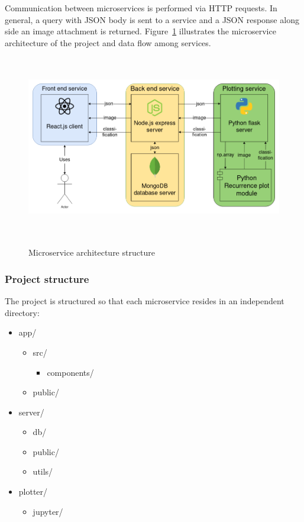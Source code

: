 \documentclass[a4paper,12pt,fleqn]{article}
\begin{document}
Communication between microservices is performed via HTTP requests. In general, a query with JSON body is sent to a service and a JSON response along side an image attachment is returned.
Figure~\ref{fig:architecture_diagram} illustrates the microservice architecture of the project and data flow among services.

\begin{figure}[h]
  \centering
  {\includegraphics[height=8cm]{assets/architecture_diagram.png}}
  \caption{Microservice architecture structure}
  \label{fig:architecture_diagram}
\end{figure}


\subsubsection{Project structure}
The project is structured so that each microservice resides in an independent directory:
\begin{itemize}
  \item app/
  \begin{itemize}
    \item src/
    \begin{itemize}
      \item components/
    \end{itemize}
    \item public/
  \end{itemize}
  \item server/
  \begin{itemize}
    \item db/
    \item public/
    \item utils/
  \end{itemize}
  \item plotter/
  \begin{itemize}
    \item jupyter/
  \end{itemize} 
\end{itemize}
\end{document}
